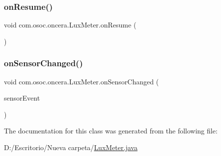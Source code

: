 \mbox{\label{classcom_1_1osoc_1_1oncera_1_1_lux_meter_a00598d35cc0be971acfe11904f60f9ff}} 
\subsubsection{\texorpdfstring{onResume()}{onResume()}}
{\footnotesize\ttfamily void com.\+osoc.\+oncera.\+Lux\+Meter.\+on\+Resume (\begin{DoxyParamCaption}{ }\end{DoxyParamCaption})\hspace{0.3cm}{\ttfamily [protected]}}

\mbox{\label{classcom_1_1osoc_1_1oncera_1_1_lux_meter_aff48623612061b570410ee97e14a7664}} 
\subsubsection{\texorpdfstring{onSensorChanged()}{onSensorChanged()}}
{\footnotesize\ttfamily void com.\+osoc.\+oncera.\+Lux\+Meter.\+on\+Sensor\+Changed (\begin{DoxyParamCaption}\item[{Sensor\+Event}]{sensor\+Event }\end{DoxyParamCaption})}



The documentation for this class was generated from the following file\+:\begin{DoxyCompactItemize}
\item 
D\+:/\+Escritorio/\+Nueva carpeta/\mbox{\hyperlink{_lux_meter_8java}{Lux\+Meter.\+java}}\end{DoxyCompactItemize}
